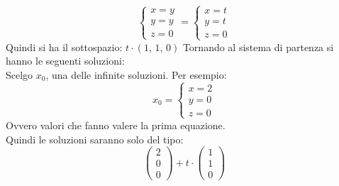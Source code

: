 \documentclass[a4paper,12pt, oneside]{book}
\begin{document}
\begin{esempio}
$$\begin{cases}
				x=y \\
				y=y \\
				z=0
			\end{cases}=\begin{cases}
				x=t \\
				y=t \\
				z=0
			\end{cases}
		$$
		Quindi si ha il sottospazio: $t\cdot(1,\,1,\,0)$
		Tornando al sistema di partenza si hanno le seguenti soluzioni:\\
		Scelgo $x_0$, una delle infinite soluzioni. Per esempio:
		$$x_0=\begin{cases}
				x=2 \\
				y=0 \\
				z=0
			\end{cases}$$
		Ovvero valori che fanno valere la prima equazione.\\
		Quindi le soluzioni saranno solo del tipo:
		$$
			\left(\begin{matrix}
					2 \\
					0 \\
					0
				\end{matrix}\right)+t\cdot
			\left(\begin{matrix}
					1 \\
					1 \\
					0
				\end{matrix}\right)
		$$
	\end{esempio}
	\newpage
\end{document}
